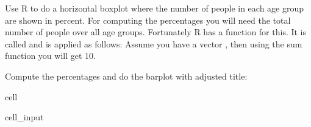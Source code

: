 \documentclass[letterpaper,10pt,english]{jupyterBook}
\begin{document}
\sphinxAtStartPar
Use R to do a horizontal box\sphinxhyphen{}plot where the number of people in each age group are shown in percent. For computing the percentages you will need the total number of people over all age groups. Fortunately R has a function for this. It is called  and is applied as follows: Assume you have a vector , then using the sum function  you will get 10.

\sphinxAtStartPar
Compute the percentages and do the barplot with adjusted title:

\begin{sphinxuseclass}{cell}\begin{sphinxVerbatimInput}

\begin{sphinxuseclass}{cell_input}
\begin{sphinxVerbatim}[commandchars=\\\{\}]
\end{sphinxVerbatim}

\end{sphinxuseclass}\end{sphinxVerbatimInput}

\end{sphinxuseclass}
\end{document}
